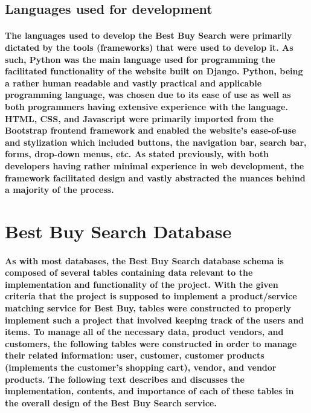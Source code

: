 \documentclass[sigconf]{acmart}
\begin{document}
\subsection{Languages used for development}

\paragraph{The languages used to develop the Best Buy Search were primarily dictated by the tools (frameworks) that were used to develop it. As such, Python was the main language used for programming the facilitated functionality of the website built on Django. Python, being a rather human readable and vastly practical and applicable programming language, was chosen due to its ease of use as well as both programmers having extensive experience with the language. HTML, CSS, and Javascript were primarily imported from the Bootstrap frontend framework and enabled the website's ease-of-use and stylization which included buttons, the navigation bar, search bar, forms, drop-down menus, etc. As stated previously, with both developers having rather minimal experience in web development, the framework facilitated design and vastly abstracted the nuances behind a majority of the process.}

\section{Best Buy Search Database}

\paragraph{As with most databases, the Best Buy Search database schema is composed of several tables containing data relevant to the implementation and functionality of the project. With the given criteria that the project is supposed to implement a product/service matching service for Best Buy, tables were constructed to properly implement such a project that involved keeping track of the users and items. To manage all of the necessary data, product vendors, and customers, the following tables were constructed in order to manage their related information: user, customer, customer products (implements the customer's shopping cart), vendor, and vendor products. The following text describes and discusses the implementation, contents, and importance of each of these tables in the overall design of the Best Buy Search service.}
\end{document}
